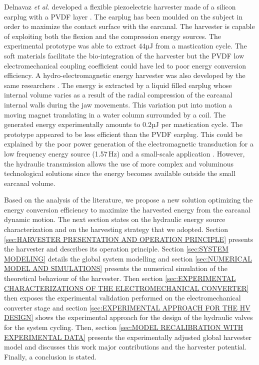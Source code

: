 \documentclass[3p,twocolumn,preprint]{elsarticle}
\begin{document}
Delnavaz \emph{et al.} developed a flexible piezoelectric harvester made of a silicon earplug with a PVDF layer \cite{Delnavaz2013}. The earplug has been moulded on the subject in order to maximize the contact surface with the earcanal. The harvester is capable of exploiting both the flexion and the compression energy sources. The experimental prototype was able to extract $44$µJ from a mastication cycle. The soft materials facilitate the bio-integration of the harvester but the PVDF low electromechanical coupling coefficient could have led to poor energy conversion efficiency. A hydro-electromagnetic energy harvester was also developed by the same researchers \cite{Delnavaz2012}. The energy is extracted by a liquid filled earplug whose internal volume varies as a result of the radial compression of the earcanal internal walls during the jaw movements. This variation put into motion a moving magnet translating in a water column surrounded by a coil. The generated energy experimentally amounts to 0.2µJ per mastication cycle. The prototype appeared to be less efficient than the PVDF earplug. This could be explained by the poor power generation of the electromagnetic transduction for a low frequency energy source (1.57\,Hz) and a small-scale application \cite{Kulah2008,Priya2017}. However, the hydraulic transmission allows the use of more complex and voluminous technological solutions since the energy becomes available outside the small earcanal volume.

Based on the analysis of the literature, we propose a new solution optimizing the energy conversion efficiency to maximize the harvested energy from the earcanal dynamic motion. The next section states on the hydraulic energy source characterization and on the harvesting strategy that we adopted. Section \ref{sec:HARVESTER PRESENTATION AND OPERATION PRINCIPLE} presents the harvester and describes its operation principle. Section \ref{sec:SYSTEM MODELING} details the global system modelling and section \ref{sec:NUMERICAL MODEL AND SIMULATIONS} presents the numerical simulation of the theoretical behaviour of the harvester. Then section \ref{sec:EXPERIMENTAL CHARACTERIZATIONS OF THE ELECTROMECHANICAL CONVERTER} then exposes the experimental validation performed on the electromechanical converter stage and section \ref{sec:EXPERIMENTAL APPROACH FOR THE HV DESIGN} shows the experimental approach for the design of the hydraulic valves for the system cycling. Then, section \ref{sec:MODEL RECALIBRATION WITH EXPERIMENTAL DATA} presents the experimentally adjusted global harvester model and discusses this work major contributions and the harvester potential. Finally, a conclusion is stated.
\end{document}
